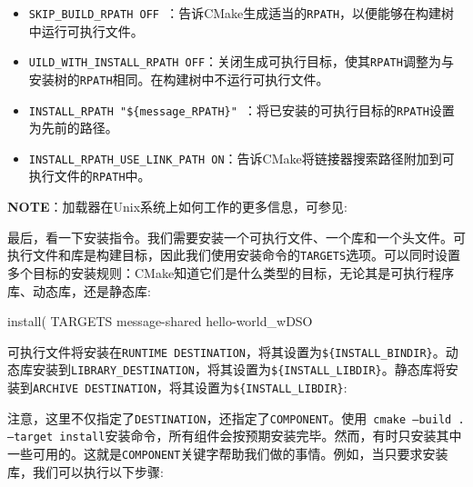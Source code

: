 \begin{itemize}
\item \texttt{SKIP\_BUILD\_RPATH OFF }：告诉CMake生成适当的\texttt{RPATH}，以便能够在构建树中运行可执行文件。

\item \texttt{UILD\_WITH\_INSTALL\_RPATH OFF}：关闭生成可执行目标，使其\texttt{RPATH}调整为与安装树的\texttt{RPATH}相同。在构建树中不运行可执行文件。

\item \texttt{INSTALL\_RPATH "\$\{message\_RPATH\}" }：将已安装的可执行目标的\texttt{RPATH}设置为先前的路径。

\item \texttt{INSTALL\_RPATH\_USE\_LINK\_PATH ON}：告诉CMake将链接器搜索路径附加到可执行文件的\texttt{RPATH}中。

\end{itemize}

\begin{myInfoBox}
\textbf{NOTE}：加载器在Unix系统上如何工作的更多信息，可参见:
\end{myInfoBox}


最后，看一下安装指令。我们需要安装一个可执行文件、一个库和一个头文件。可执行文件和库是构建目标，因此我们使用安装命令的\texttt{TARGETS}选项。可以同时设置多个目标的安装规则：CMake知道它们是什么类型的目标，无论其是可执行程序库、动态库，还是静态库:

\begin{codebox}[cmake]
install(
  TARGETS
    message-shared
    hello-world_wDSO
\end{codebox}

可执行文件将安装在\texttt{RUNTIME DESTINATION}，将其设置为\texttt{\$\{INSTALL\_BINDIR\}}。动态库安装到\texttt{LIBRARY\_DESTINATION}，将其设置为\texttt{\$\{INSTALL\_LIBDIR\}}。静态库将安装到\texttt{ARCHIVE DESTINATION}，将其设置为\texttt{\$\{INSTALL\_LIBDIR\}}:


注意，这里不仅指定了\texttt{DESTINATION}，还指定了\texttt{COMPONENT}。使用\texttt{ cmake --build . --target install}安装命令，所有组件会按预期安装完毕。然而，有时只安装其中一些可用的。这就是\texttt{COMPONENT}关键字帮助我们做的事情。例如，当只要求安装库，我们可以执行以下步骤:

